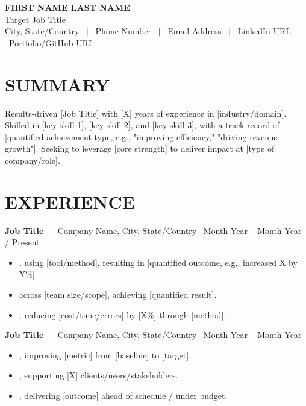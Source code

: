 \documentclass[10.5pt, letterpaper]{article}
\newcommand{\entry}[4]{%
  \noindent\textbf{#1} --- #3, #4 \textbar\ #2\par
  \vspace{2pt}
}
\newcommand{\resumeItem}[1]{\item #1}
\begin{document}
\RaggedRight

\begin{center}
  {\Huge \textbf{FIRST NAME LAST NAME}}\\[4pt]
  {\large Target Job Title}\\[4pt]
  City, State/Country \ $|$ \ Phone Number \ $|$ \ Email Address \ $|$ \ LinkedIn URL \ $|$ \ Portfolio/GitHub URL
\end{center}

\vspace{2pt}

\section{SUMMARY}
Results-driven [Job Title] with [X] years of experience in [industry/domain]. Skilled in [key skill 1], [key skill 2], and [key skill 3], with a track record of [quantified achievement type, e.g., "improving efficiency," "driving revenue growth"]. Seeking to leverage [core strength] to deliver impact at [type of company/role].

\section{EXPERIENCE}

\entry{Job Title}{Month Year -- Month Year / Present}{Company Name}{City, State/Country}
\begin{itemize}
  \resumeItem{[Action verb] [task/project], using [tool/method], resulting in [quantified outcome, e.g., increased X by Y\%].}
  \resumeItem{[Action verb] [task/project] across [team size/scope], achieving [quantified result].}
  \resumeItem{[Action verb] [task/project], reducing [cost/time/errors] by [X\%] through [method].}
\end{itemize}

\entry{Job Title}{Month Year -- Month Year}{Company Name}{City, State/Country}
\begin{itemize}
  \resumeItem{[Action verb] [task/project], improving [metric] from [baseline] to [target].}
  \resumeItem{[Action verb] [task/project], supporting [X] clients/users/stakeholders.}
  \resumeItem{[Action verb] [task/project], delivering [outcome] ahead of schedule / under budget.}
\end{itemize}
\end{document}
